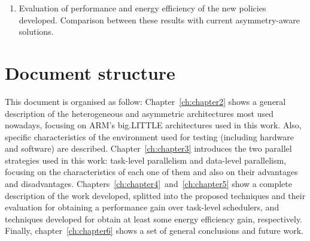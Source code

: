 \begin{enumerate}[T1.]


\item Evaluation of performance and energy efficiency of the new policies
  developed. Comparison between these results with current asymmetry-aware
  solutions. 
\end{enumerate}


\section*{Document structure}
This document is organised as follow: Chapter~\ref{ch:chapter2} shows a
general description of the heterogeneous and asymmetric architectures most
used nowadays, focusing on ARM's big.LITTLE architectures used in this
work. Also, specific characteristics of the environment used for testing
(including hardware and software) are described. Chapter~\ref{ch:chapter3}
introduces the two parallel strategies used in this work: task-level
parallelism and data-level parallelism, focusing on the characteristics of
each one of them and also on their advantages and disadvantages.
Chapters~\ref{ch:chapter4}~and~\ref{ch:chapter5} show a complete
description of the work developed, splitted into the proposed techniques
and their evaluation for obtaining a performance gain over task-level
schedulers, and techniques developed for obtain at least some energy
efficiency gain, respectively. Finally, chapter~\ref{ch:chapter6} shows a
set of general conclusions and future work.


